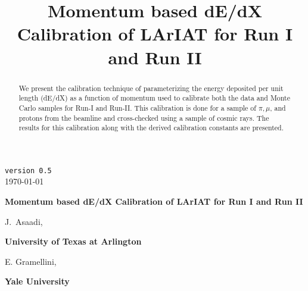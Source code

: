 \documentclass[a4paper]{article}
\title{Momentum based dE/dX Calibration of LArIAT for Run I and Run II}
\begin{document}
\def\Journal#1#2#3#4{{#1} {\bf #2}, #3 (#4)}
\def\etal{{\it et\ al.}}
\def\numunue{\nu_\mu\rightarrow\nu_e}
\def\numunutau{\nu_\mu\rightarrow\nu_\tau}
\def\nuebar{\bar\nu_e}
\def\nue{\nu_e}
\def\nutau{\nu_\tau}
\def\numubar{\bar\nu_\mu}
\def\numu{\nu_\mu}
\def\ra{\rightarrow}
\def\numubarnuebar{\bar\nu_\mu\rightarrow\bar\nu_e}
\def\nuebarnumubar{\bar\nu_e\rightarrow\bar\nu_\mu}
\def\osc{\rightsquigarrow}
\def\inteni{{\cal I}_{pot}}
\def\fmerit{{\cal F}}
\begin{flushright}
{\tt version 0.5}\\ 
\today
\end{flushright}
\vspace*{0.6cm}
\begin{center}
{\Large \bf Momentum based dE/dX Calibration of LArIAT for Run I and Run II} 
\vspace*{1.6cm}
\setcounter{footnote}{0}  
\def\A{\kern+.6ex\lower.42ex\hbox{$\scriptstyle \iota$}\kern-1.20ex a}
\def\E{\kern+.5ex\lower.42ex\hbox{$\scriptstyle \iota$}\kern-1.10ex e}
\small
\newcommand{\Aname}[2]{#1}
\def\titlefoot#1{\vspace{-0.3cm}\begin{center}{\bf #1}\end{center}}

\Aname{J.~Asaadi}{UTA},

\titlefoot{University of Texas at Arlington\label{UTA}}

\Aname{E. Gramellini}{Yale},

\titlefoot{Yale University\label{Yale}}

\end{center}
\vspace*{1cm}


\begin{abstract}

We present the calibration technique of parameterizing the energy deposited per unit length (dE/dX) as a function of momentum used to calibrate both the data and Monte Carlo samples for Run-I and Run-II. This calibration is done for a sample of $\pi, \mu$, and protons from the beamline and cross-checked using a sample of cosmic rays. The results for this calibration along with the derived calibration constants are presented.

\end{abstract} 
\end{document}

